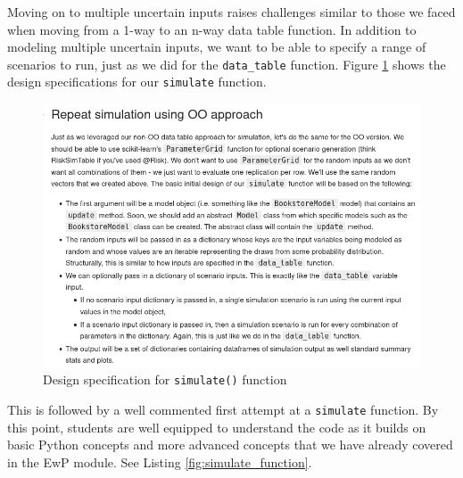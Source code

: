 \documentclass[ited]{informs3}                      %
\newcommand{\code}[1]{\texttt{#1}}
\begin{document}
Moving on to multiple uncertain inputs raises challenges similar to those we faced when moving from a 1-way to an n-way data table function. In addition to modeling multiple uncertain inputs, we want to be able to specify a range of scenarios to run, just as we did for the \code{data\_table} function. Figure \ref{fig:oo_sim_design_specs} shows the design specifications for our \code{simulate} function.

\begin{figure}[!htbp]
\centering
\includegraphics[scale=0.5]{images/oo_sim_design_specs}
\caption{Design specification for \code{simulate()} function}
\label{fig:oo_sim_design_specs}
\end{figure}


This is followed by a well commented first attempt at a \code{simulate} function. By this point, students are well equipped to understand the code as it builds on basic Python concepts and more advanced concepts that we have already covered in the EwP module. See Listing \ref{fig:simulate_function}.
\end{document}
